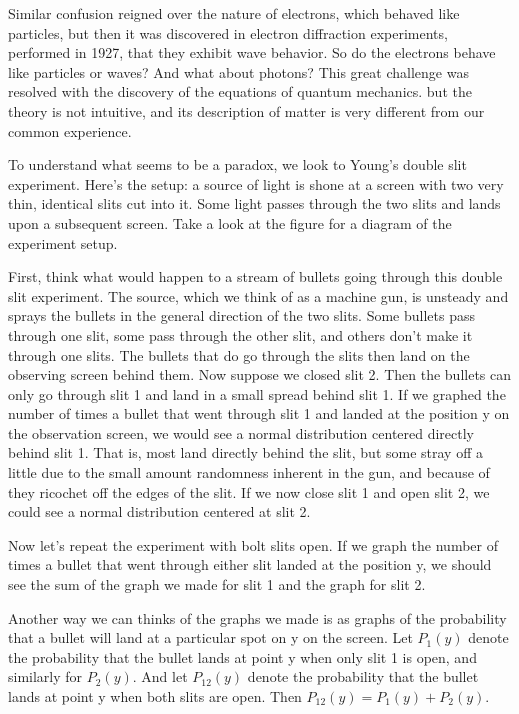 \documentclass[12pt, oneside]{book}
\theoremstyle{definition}
\theoremstyle{definition}
\theoremstyle{remark}
\begin{document}
Similar confusion reigned over the nature of electrons, which behaved like particles, but then it was discovered in electron diffraction experiments, performed in 1927, that they exhibit wave behavior. So do the electrons behave like particles or waves? And what about photons? This great challenge was resolved with the discovery of the equations of quantum mechanics. but the theory is not intuitive, and its description of matter is very different from our common experience.

To understand what seems to be a paradox, we look to Young's double slit experiment. Here's the setup: a source of light is shone at a screen with two very thin, identical slits cut into it. Some light passes through the two slits and lands upon a subsequent screen. Take a look at the figure for a diagram of the experiment setup.

First, think what would happen to a stream of bullets going through this double slit experiment. The source, which we think of as a machine gun, is unsteady and sprays the bullets in the general direction of the two slits. Some bullets pass through one slit, some pass through the other slit, and others don't make it through one slits. The bullets that do go through the slits then land on the observing screen behind them. Now suppose we closed slit 2. Then the bullets can only go through slit 1 and land in a small spread behind slit 1. If we graphed the number of times a bullet that went through slit 1 and landed at the position y on the observation screen, we would see a normal distribution centered directly behind slit 1. That is, most land directly behind the slit, but some stray off a little due to the small amount randomness inherent in the gun, and because of they ricochet off the edges of the slit. If we now close slit 1 and open slit 2, we could see a normal distribution centered at slit 2.

Now let's repeat the experiment with bolt slits open. If we graph the number of times a bullet that went through either slit landed at the position y, we should see the sum of the graph we made for slit 1 and the graph for slit 2.

Another way we can thinks of the graphs we made is as graphs of the probability that a bullet will land at a particular spot on y on the screen. Let $P_1(y)$ denote the probability that the bullet lands at point y when only slit 1 is open, and similarly for $P_2(y)$. And let $P_{12}(y)$ denote the probability that the bullet lands at point y when both slits are open. Then $P_{12}(y)=P_1(y)+P_2(y)$.
\end{document}
